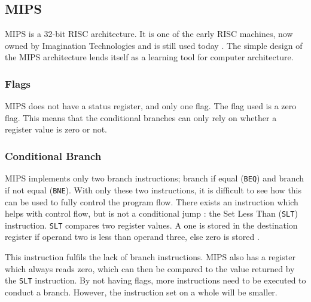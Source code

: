 \documentclass[12pt,a4paper]{article}
\begin{document}
\begin{bibunit}[is-unsrt]
\begin{lstlisting}[frame=single,caption=Intel 8086 assembler for listing \ref{ListC2},label=intel2]
\end{lstlisting}
%  

\subsection{MIPS}

MIPS is a 32-bit RISC architecture.
It is one of the early RISC machines, now owned by Imagination Technologies and is still used today \cite{mips:wiki}.
The simple design of the MIPS architecture lends itself as a learning tool for computer architecture.

\subsubsection{Flags}

MIPS does not have a status register, and only one flag.
The flag used is a zero flag. 
This means that the conditional branches can only rely on whether a register value is zero or not.


\subsubsection{Conditional Branch}

MIPS implements only two branch instructions; branch if equal (\texttt{BEQ}) and branch if not equal (\texttt{BNE}).
With only these two instructions, it is difficult to see how this can be used to fully control the program flow.
There exists an instruction which helps with control flow, but is not a conditional jump : the Set Less Than (\texttt{SLT}) instruction.
\texttt{SLT} compares two register values.
A one is stored in the destination register if operand two is less than operand three, else zero is stored \cite{patterson2013computer}.

This instruction fulfils the lack of branch instructions.
MIPS also has a register which always reads zero, which can then be compared to the value returned by the \texttt{SLT} instruction.
By not having flags, more instructions need to be executed to conduct a branch. 
However, the instruction set on a whole will be smaller.


%  

\end{bibunit}
\end{document}
